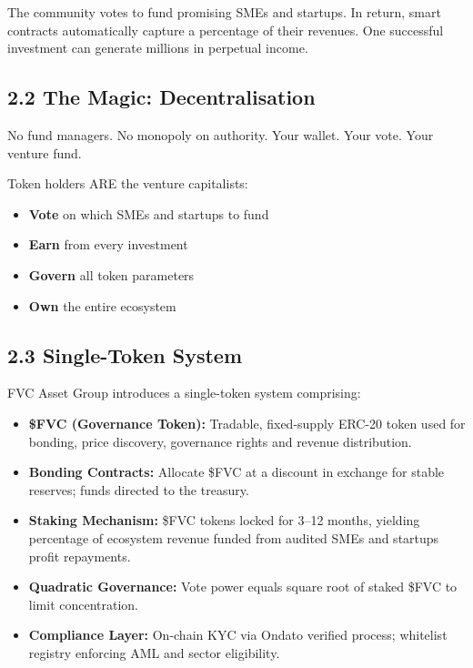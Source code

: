 \documentclass[
  paper=a4,
  ,captions=tableheading
]{scrartcl}
\providecommand{\tightlist}{%
  \setlength{\itemsep}{0pt}\setlength{\parskip}{0pt}}
\begin{document}
The community votes to fund promising SMEs
and startups. In return, smart contracts automatically capture a
percentage of their revenues. One successful investment can generate
millions in perpetual income.

\subsection{2.2 The Magic:
Decentralisation}\label{the-magic-decentralisation}

No fund managers. No monopoly on authority. Your wallet. Your vote. Your venture fund.

Token holders ARE the venture capitalists:

\begin{itemize}
\tightlist
\item
  \textbf{Vote} on which SMEs and startups
  to fund
\item
  \textbf{Earn} from every investment
\item
  \textbf{Govern} all token parameters
\item
  \textbf{Own} the entire ecosystem
\end{itemize}

\subsection{2.3 Single-Token System}\label{single-token-system}

FVC Asset Group introduces a single-token system comprising:

\begin{itemize}
\tightlist
\item{\textbf{\$FVC (Governance Token):}} Tradable, fixed-supply ERC-20 token used for bonding, price discovery, governance rights and revenue distribution.
\item
  \textbf{Bonding Contracts:} Allocate \$FVC at a discount in exchange
  for stable reserves; funds directed to the treasury.
\item
  \textbf{Staking Mechanism:} \$FVC tokens locked for 3--12 months,
  yielding percentage of ecosystem revenue funded from audited SMEs and startups profit repayments.
\item
  \textbf{Quadratic Governance:} Vote power equals square root of staked
  \$FVC to limit concentration.
\item
  \textbf{Compliance Layer:} On-chain KYC via Ondato verified process;
  whitelist registry enforcing AML and sector eligibility.
\end{itemize}
\end{document}
